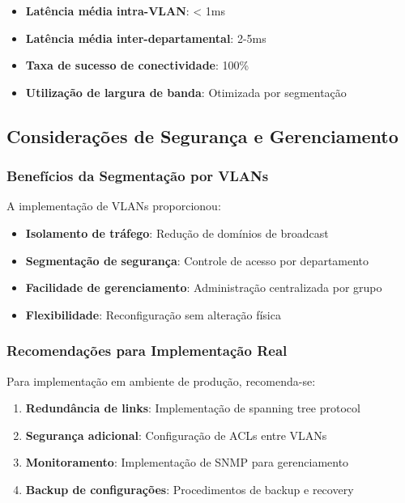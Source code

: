 \begin{itemize}
    \item \textbf{Latência média intra-VLAN}: < 1ms
    \item \textbf{Latência média inter-departamental}: 2-5ms
    \item \textbf{Taxa de sucesso de conectividade}: 100\%
    \item \textbf{Utilização de largura de banda}: Otimizada por segmentação
\end{itemize}

\subsection{Considerações de Segurança e Gerenciamento}

\subsubsection{Benefícios da Segmentação por VLANs}

A implementação de VLANs proporcionou:

\begin{itemize}
    \item \textbf{Isolamento de tráfego}: Redução de domínios de broadcast
    \item \textbf{Segmentação de segurança}: Controle de acesso por departamento
    \item \textbf{Facilidade de gerenciamento}: Administração centralizada por grupo
    \item \textbf{Flexibilidade}: Reconfiguração sem alteração física
\end{itemize}

\subsubsection{Recomendações para Implementação Real}

Para implementação em ambiente de produção, recomenda-se:

\begin{enumerate}
    \item \textbf{Redundância de links}: Implementação de spanning tree protocol
    \item \textbf{Segurança adicional}: Configuração de ACLs entre VLANs
    \item \textbf{Monitoramento}: Implementação de SNMP para gerenciamento
    \item \textbf{Backup de configurações}: Procedimentos de backup e recovery
\end{enumerate}

